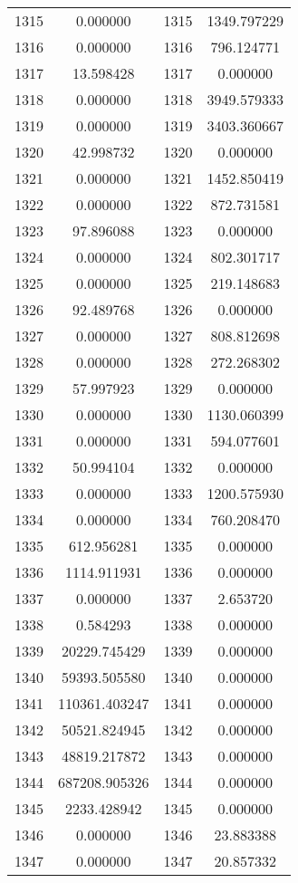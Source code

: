 \documentclass[12pt]{article}
\begin{document}
\begin{longtable}{@{}cccc@{}}
1315 & 0.000000 & 1315 & 1349.797229 \\
1316 & 0.000000 & 1316 & 796.124771 \\
1317 & 13.598428 & 1317 & 0.000000 \\
1318 & 0.000000 & 1318 & 3949.579333 \\
1319 & 0.000000 & 1319 & 3403.360667 \\
1320 & 42.998732 & 1320 & 0.000000 \\
1321 & 0.000000 & 1321 & 1452.850419 \\
1322 & 0.000000 & 1322 & 872.731581 \\
1323 & 97.896088 & 1323 & 0.000000 \\
1324 & 0.000000 & 1324 & 802.301717 \\
1325 & 0.000000 & 1325 & 219.148683 \\
1326 & 92.489768 & 1326 & 0.000000 \\
1327 & 0.000000 & 1327 & 808.812698 \\
1328 & 0.000000 & 1328 & 272.268302 \\
1329 & 57.997923 & 1329 & 0.000000 \\
1330 & 0.000000 & 1330 & 1130.060399 \\
1331 & 0.000000 & 1331 & 594.077601 \\
1332 & 50.994104 & 1332 & 0.000000 \\
1333 & 0.000000 & 1333 & 1200.575930 \\
1334 & 0.000000 & 1334 & 760.208470 \\
1335 & 612.956281 & 1335 & 0.000000 \\
1336 & 1114.911931 & 1336 & 0.000000 \\
1337 & 0.000000 & 1337 & 2.653720 \\
1338 & 0.584293 & 1338 & 0.000000 \\
1339 & 20229.745429 & 1339 & 0.000000 \\
1340 & 59393.505580 & 1340 & 0.000000 \\
1341 & 110361.403247 & 1341 & 0.000000 \\
1342 & 50521.824945 & 1342 & 0.000000 \\
1343 & 48819.217872 & 1343 & 0.000000 \\
1344 & 687208.905326 & 1344 & 0.000000 \\
1345 & 2233.428942 & 1345 & 0.000000 \\
1346 & 0.000000 & 1346 & 23.883388 \\
1347 & 0.000000 & 1347 & 20.857332 \\

\end{longtable}
\end{document}
